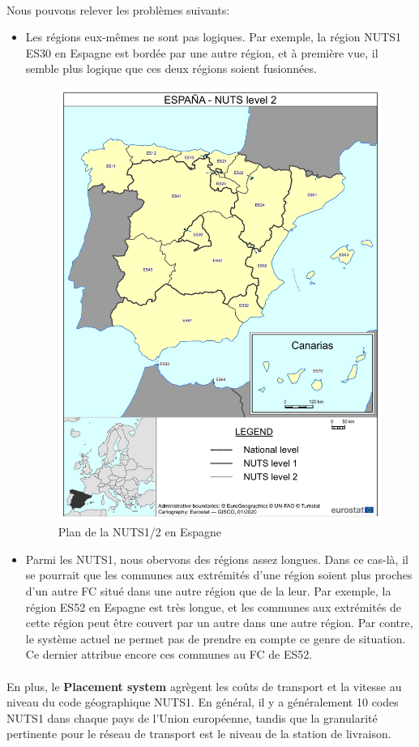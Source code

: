 \paragraph{}
\vspace{-2em}
Nous pouvons relever les problèmes suivants:
\begin{itemize}
    \item Les régions eux-mêmes ne sont pas logiques. Par exemple, la région NUTS1 ES30 en Espagne est bordée par une autre région, et à première vue, il semble plus logique que ces deux régions soient fusionnées.
    \begin{figure}[htbp]
        \centering
        \includegraphics[width=0.6\linewidth]{./Graphismes-UTC/logos/Amazon/NUTS-2-ES.pdf}\hfill
        \caption{Plan de la NUTS1/2 en Espagne}
    \end{figure}
    \item Parmi les NUTS1, nous obervons des régions assez longues. Dans ce cas-là, il se pourrait que les communes aux extrémités d'une région soient plus proches d'un autre FC situé dans une autre région que de la leur. Par exemple, la région ES52 en Espagne est très longue, et les communes aux extrémités de cette région peut être couvert par un autre dans une autre région. Par contre, le système actuel ne permet pas de prendre en compte ce genre de situation. Ce dernier attribue encore ces communes au FC de ES52.
\end{itemize}
\paragraph{}
\vspace{-2em}
En plus, le \textbf{Placement system} agrègent les coûts de transport et la vitesse au niveau du code géographique NUTS1. En général, il y a généralement 10 codes NUTS1 dans chaque pays de l'Union européenne, tandis que la granularité pertinente pour le réseau de transport est le niveau de la station de livraison.
